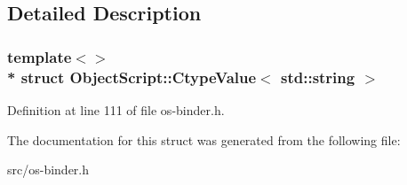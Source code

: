 \subsection{Detailed Description}
\subsubsection*{template$<$$>$\\*
struct Object\+Script\+::\+Ctype\+Value$<$ std\+::string $>$}



Definition at line 111 of file os-\/binder.\+h.



The documentation for this struct was generated from the following file\+:\begin{DoxyCompactItemize}
\item 
src/os-\/binder.\+h\end{DoxyCompactItemize}
